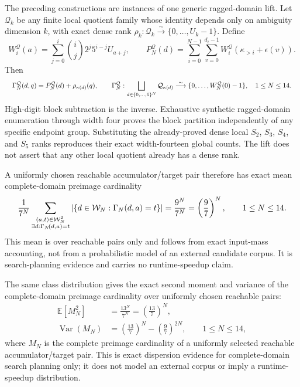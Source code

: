 \documentclass{article}
\newcommand{\fitmath}[1]{\resizebox{0.99\linewidth}{!}{$\displaystyle #1$}}
\begin{document}
The preceding constructions are instances of one generic ragged-domain lift.
Let $\mathcal Q_k$ be any finite local quotient family whose identity depends
only on ambiguity dimension $k$, with exact dense rank
$\rho_k:\mathcal Q_k\overset{\sim}{\to}\{0,\ldots,U_k-1\}$. Define
\[
  W^{\mathcal Q}_i(a)=
    \sum_{j=0}^{i}\binom{i}{j}2^j5^{i-j}U_{a+j},
  \qquad
  P^{\mathcal Q}_N(d)=\sum_{i=0}^{N-1}\sum_{v=0}^{d_i-1}
    W^{\mathcal Q}_i\!\left(\kappa_{>i}+\epsilon(v)\right).
\]
Then
\begin{equation}
  \fitmath{%
    \Gamma^{\mathcal Q}_N(d,q)=
      P^{\mathcal Q}_N(d)+\rho_{\kappa(d)}(q),
    \qquad
    \Gamma^{\mathcal Q}_N:
      \bigsqcup_{d\in\{0,\ldots,6\}^N}\mathcal Q_{\kappa(d)}
      \overset{\sim}{\longrightarrow}
      \{0,\ldots,W^{\mathcal Q}_N(0)-1\},
    \quad 1\leq N\leq14.
  }
  \label{eq:optimization-crazy-global-ragged-quotient-ranking}
\end{equation}
High-digit block subtraction is the inverse. Exhaustive synthetic ragged-domain
enumeration through width four proves the block partition independently of any
specific endpoint group. Substituting the already-proved dense local $S_2$,
$S_3$, $S_4$, and $S_5$ ranks reproduces their exact width-fourteen global
counts. The lift does not
assert that any other local quotient already has a dense rank.

A uniformly chosen reachable accumulator/target pair therefore has exact mean
complete-domain preimage cardinality
\begin{equation}
  \frac{1}{7^N}
  \sum_{\substack{(a,t)\in\mathcal{W}_{N}^{2}\\
                   \exists d:\Gamma_{N}\!\left(d,a\right)=t}}
    \left|\left\{d\in\mathcal{W}_{N}:\Gamma_{N}\!\left(d,a\right)=t\right\}\right|
    =\frac{9^N}{7^N}=\left(\frac{9}{7}\right)^N,
  \qquad 1\leq N\leq14.
  \label{eq:optimization-crazy-profile-mean-preimage-count}
\end{equation}
This mean is over reachable pairs only and follows from exact input-mass
accounting, not from a probabilistic model of an external candidate corpus. It
is search-planning evidence and carries no runtime-speedup claim.

The same class distribution gives the exact second moment and variance of the
complete-domain preimage cardinality over uniformly chosen reachable pairs:
\begin{equation}
  \begin{aligned}
    \mathbb{E}[M_N^2]
      &= \frac{13^N}{7^N}=\left(\frac{13}{7}\right)^N,\\
    \operatorname{Var}(M_N)
      &= \left(\frac{13}{7}\right)^N
       - \left(\frac{9}{7}\right)^{2N},
    \qquad 1\leq N\leq14,
  \end{aligned}
  \label{eq:optimization-crazy-profile-preimage-variance}
\end{equation}
where $M_N$ is the complete preimage cardinality of a uniformly selected
reachable accumulator/target pair. This is exact dispersion evidence for
complete-domain search planning only; it does not model an external corpus or
imply a runtime-speedup distribution.
\end{document}
